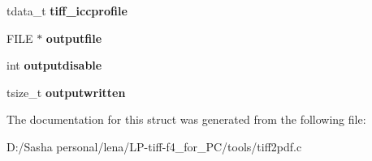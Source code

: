 \begin{DoxyCompactItemize}
\item 
\hypertarget{struct_t2_p_a82e760e12fe97668082125fffc0fd673}{}tdata\+\_\+t {\bfseries tiff\+\_\+iccprofile}\label{struct_t2_p_a82e760e12fe97668082125fffc0fd673}

\item 
\hypertarget{struct_t2_p_a0522de1f60e980190c256b21ef43b8b7}{}F\+I\+L\+E $\ast$ {\bfseries outputfile}\label{struct_t2_p_a0522de1f60e980190c256b21ef43b8b7}

\item 
\hypertarget{struct_t2_p_ad78e030c9fcfae9cc7041e9bb588b966}{}int {\bfseries outputdisable}\label{struct_t2_p_ad78e030c9fcfae9cc7041e9bb588b966}

\item 
\hypertarget{struct_t2_p_af038191b3cd88573383c7e84fb74a044}{}tsize\+\_\+t {\bfseries outputwritten}\label{struct_t2_p_af038191b3cd88573383c7e84fb74a044}

\end{DoxyCompactItemize}


The documentation for this struct was generated from the following file\+:\begin{DoxyCompactItemize}
\item 
D\+:/\+Sasha personal/lena/\+L\+P-\/tiff-\/f4\+\_\+for\+\_\+\+P\+C/tools/tiff2pdf.\+c\end{DoxyCompactItemize}
